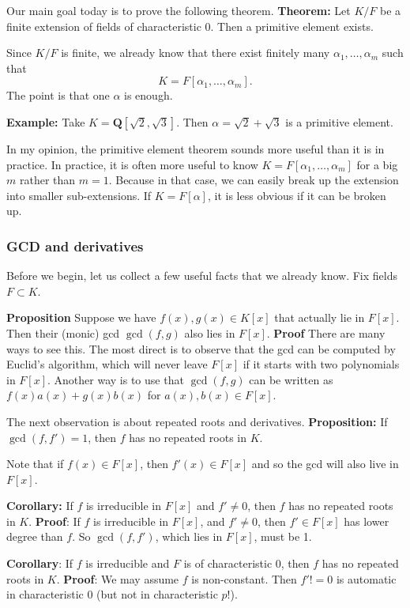 \documentclass[11pt]{article}
\begin{document}
Our main goal today is to prove the following theorem.
\textbf{\textbf{Theorem:}} Let \(K/F\) be a finite extension of fields of characteristic 0.  Then a primitive element exists.

Since \(K/F\) is finite, we already know that there exist finitely many \(\alpha_1, \dots, \alpha_{m}\) such that
\[ K = F[\alpha_1, \dots, \alpha_m].\]
The point is that one \(\alpha\) is enough.

\textbf{\textbf{Example:}} Take \(K = \mathbf{Q}[\sqrt 2, \sqrt 3]\).  Then \(\alpha = \sqrt 2 + \sqrt 3\) is a primitive element.

In my opinion, the primitive element theorem sounds more useful than it is in practice.
In practice, it is often more useful to know \(K = F[\alpha_1, \dots, \alpha_m]\) for a big \(m\) rather than \(m = 1\).
Because in that case, we can easily break up the extension into smaller sub-extensions. 
If \(K = F[\alpha]\), it is less obvious if it can be broken up.
\subsubsection{GCD and derivatives}
\label{sec:org206ac85}
Before we begin, let us collect a few useful facts that we already know.
Fix fields \(F \subset K\).

\textbf{\textbf{Proposition}} Suppose we have \(f(x), g(x) \in K[x]\) that actually lie in \(F[x]\).
Then their (monic) gcd \(\gcd(f,g)\) also lies in \(F[x]\).
\textbf{\textbf{Proof}} There are many ways to see this.  The most direct is to observe that the gcd can be computed by Euclid's algorithm, which will never leave \(F[x]\) if it starts with two polynomials in \(F[x]\).
Another way is to use that \(\gcd(f,g)\) can be written as \(f(x) a(x) + g(x) b(x)\) for \(a(x), b(x) \in F[x]\).

The next observation is about repeated roots and derivatives.
\textbf{\textbf{Proposition:}} If \(\gcd(f, f') = 1\), then \(f\) has no repeated roots in \(K\).

Note that if \(f(x) \in F[x]\), then \(f'(x) \in F[x]\) and so the gcd will also live in \(F[x]\).

\textbf{\textbf{Corollary:}} If \(f\) is irreducible in \(F[x]\) and \(f' \neq 0\), then \(f\) has no repeated roots in \(K\).
\textbf{\textbf{Proof}}: If \(f\) is irreducible in \(F[x]\), and \(f' \neq 0\), then \(f' \in F[x]\) has lower degree than \(f\).
So \(\gcd(f,f')\), which lies in \(F[x]\), must be 1.

\textbf{\textbf{Corollary}}: If \(f\) is irreducible and \(F\) is of characteristic 0, then \(f\) has no repeated roots in \(K\).
\textbf{\textbf{Proof}}: We may assume \(f\) is non-constant.  Then \(f' != 0\) is automatic in characteristic 0 (but not in characteristic \(p\)!).
\end{document}
